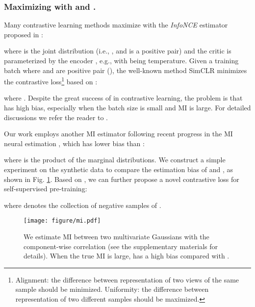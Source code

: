 \documentclass[runningheads]{llncs}
\begin{document}
\subsubsection{Maximizing  with  and .}
Many contrastive learning methods \cite{oord2018representation,chen2020a} maximize  with the \textit{InfoNCE} estimator proposed in \cite{oord2018representation}:
\begin{footnotesize}

\end{footnotesize}

\noindent where  is the joint distribution (i.e., , and  is a positive pair) and the critic  is parameterized by the encoder , e.g.,  with  being temperature.
Given a training batch  where  and  are positive pair (), the well-known method SimCLR \cite{chen2020a} minimizes the contrastive loss\footnote{Alignment: the difference between representation of two views of the same sample should be minimized. Uniformity: the difference between representation of two different samples should be maximized.} based on :
\begin{footnotesize}

\end{footnotesize}

\noindent where .
Despite the great success of  in contrastive learning, the problem is that  has high bias, especially when the batch size is small and MI is large.
For detailed discussions we refer the reader to \cite{poole2019on, song2020understanding}.

Our work employs another MI estimator  following recent progress in the MI neural estimation \cite{belghazi2018mutual}, which has lower bias than  \cite{poole2019on, song2020understanding}:
\begin{footnotesize}

\end{footnotesize}

\noindent
where  is the product of the marginal distributions.
We construct a simple experiment on the synthetic data to compare the estimation bias of  and , as shown in Fig. \ref{fig:mi}.
Based on , we can further propose a novel contrastive loss for self-supervised pre-training:
\begin{footnotesize}

\end{footnotesize}

\noindent 
where  denotes the collection of negative samples of .

\begin{figure}[t]
    \centering  
    \begin{minipage}[c]{0.3\textwidth}
    \texttt{[image: figure/mi.pdf]}
    \end{minipage}\hfill
    \begin{minipage}[c]{0.65\textwidth}
    \caption{We estimate MI between two multivariate Gaussians with the component-wise correlation  (see the supplementary materials for details). When the true MI is large,  has a high bias compared with .}
    \label{fig:mi}
    \end{minipage}
\end{figure}
\end{document}
